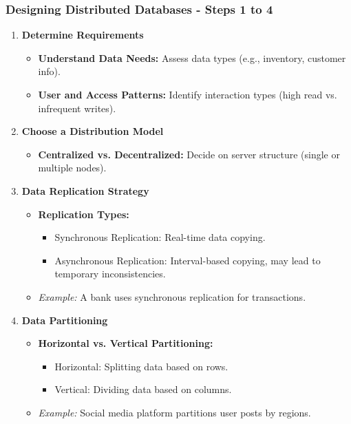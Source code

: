 \documentclass[aspectratio=169]{beamer}
\begin{document}
\begin{frame}[fragile]
  \frametitle{Designing Distributed Databases - Steps 1 to 4}
  \begin{enumerate}
    \item \textbf{Determine Requirements}
      \begin{itemize}
        \item \textbf{Understand Data Needs:} Assess data types (e.g., inventory, customer info).
        \item \textbf{User and Access Patterns:} Identify interaction types (high read vs. infrequent writes).
      \end{itemize}
  
    \item \textbf{Choose a Distribution Model}
      \begin{itemize}
        \item \textbf{Centralized vs. Decentralized:} Decide on server structure (single or multiple nodes).
      \end{itemize}
  
    \item \textbf{Data Replication Strategy}
      \begin{itemize}
        \item \textbf{Replication Types:}
          \begin{itemize}
            \item Synchronous Replication: Real-time data copying.
            \item Asynchronous Replication: Interval-based copying, may lead to temporary inconsistencies.
          \end{itemize}
          \item \textit{Example:} A bank uses synchronous replication for transactions.
      \end{itemize}
  
    \item \textbf{Data Partitioning}
      \begin{itemize}
        \item \textbf{Horizontal vs. Vertical Partitioning:}
          \begin{itemize}
            \item Horizontal: Splitting data based on rows.
            \item Vertical: Dividing data based on columns.
          \end{itemize}
          \item \textit{Example:} Social media platform partitions user posts by regions.
      \end{itemize}
  \end{enumerate}
\end{frame}
\end{document}
